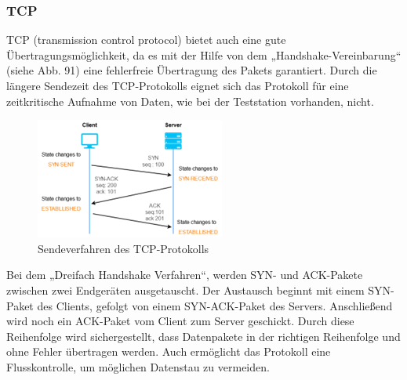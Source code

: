 \subsubsection{TCP}
TCP\autocite{TCP} (transmission control protocol) bietet auch eine gute Übertragungsmöglichkeit, da es mit der Hilfe von dem „Handshake-Vereinbarung“ (siehe Abb. 91) eine fehlerfreie Übertragung des Pakets garantiert. Durch die längere Sendezeit des TCP-Protokolls eignet sich das Protokoll für eine zeitkritische Aufnahme von Daten, wie bei der Teststation vorhanden, nicht.\\
\vspace{3mm}
\begin{figure}[H]
	\centering
	\includegraphics[scale=1.1]{image/sendeverfahren.png}
	\caption{Sendeverfahren des TCP-Protokolls\autocite{TCP-Handshake}}
\end{figure}
\vspace{3mm}
Bei dem „Dreifach Handshake Verfahren“, werden SYN- und ACK-Pakete zwischen zwei Endgeräten ausgetauscht. Der Austausch beginnt mit einem SYN-Paket des Clients, gefolgt von einem SYN-ACK-Paket des Servers. Anschließend wird noch ein ACK-Paket vom Client zum Server geschickt. Durch diese Reihenfolge wird sichergestellt, dass Datenpakete in der richtigen Reihenfolge und ohne Fehler übertragen werden. Auch ermöglicht das Protokoll eine Flusskontrolle, um möglichen Datenstau zu vermeiden.


